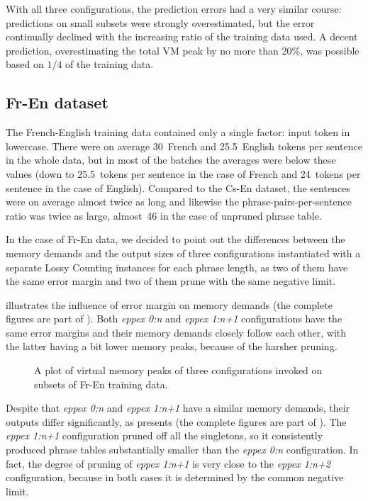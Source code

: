 With all three configurations, the prediction errors had a very similar course: predictions on small
subsets were strongly overestimated, but the error continually declined with the increasing ratio
of the training data used.
A decent prediction, overestimating the total VM peak by no more than 20\%, was possible based on $1/4$
of the training data.

\subsection{Fr-En dataset}

The French-English training data contained only a single factor: input token in lowercase.
There were on average 30~French and 25.5~English tokens per sentence in the whole data,
but in most of the batches the averages were below these values (down to 25.5~tokens
per sentence in the case of French and 24~tokens per sentence in the case of English).
Compared to the Cs-En dataset, the sentences were on average almost twice as long and
likewise the phrase-pairs-per-sentence ratio was twice as large, almost~46 in the case of
unpruned phrase table.

In the case of Fr-En data, we decided to point out the differences between the memory demands
and the output sizes of three \eppex{} configurations instantiated with a separate Lossy Counting
instances for each phrase length, as two of them have the same error margin and two of them
prune with the same negative limit.

 illustrates the influence of error margin on \eppex{} memory demands
(the complete figures are part of ).
Both \emph{eppex 0:n} and \emph{eppex 1:n+1} configurations have the same error margins and
their memory demands closely follow each other, with the latter having a bit lower memory
peaks, because of the harsher pruning.

\begin{figure}[!htb]
  \centering
  
  \caption{
    A plot of virtual memory peaks of three \eppex{} configurations invoked on subsets of Fr-En training data.
  }
  \label{fig:fr-en-vm-peaks}
\end{figure}

Despite that \emph{eppex 0:n} and \emph{eppex 1:n+1} have a similar memory demands, their outputs
differ significantly, as  presents (the complete figures are part
of ).
The \emph{eppex 1:n+1} configuration pruned off all the singletons, so it consistently
produced phrase tables substantially smaller than the \emph{eppex 0:n} configuration.
In fact, the degree of pruning of \emph{eppex 1:n+1} is very close to the \emph{eppex 1:n+2} configuration,
because in both cases it is determined by the common negative limit.

